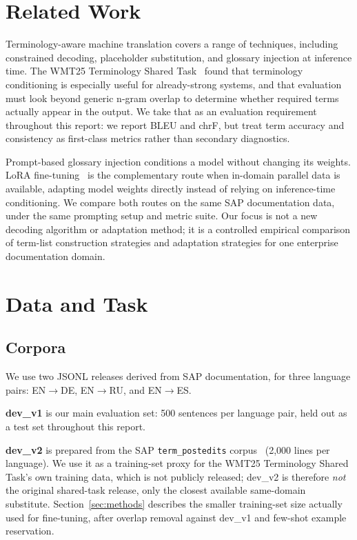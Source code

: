 \documentclass[11pt]{article}
\begin{document}
\section{Related Work}
\label{sec:related-work}

Terminology-aware machine translation covers a range of techniques, including constrained decoding, placeholder substitution, and glossary injection at inference time. The WMT25 Terminology Shared Task~\citep{semenov-etal-2025-wmt25} found that terminology conditioning is especially useful for already-strong systems, and that evaluation must look beyond generic n-gram overlap to determine whether required terms actually appear in the output. We take that as an evaluation requirement throughout this report: we report BLEU and chrF, but treat term accuracy and consistency as first-class metrics rather than secondary diagnostics.

Prompt-based glossary injection conditions a model without changing its weights. LoRA fine-tuning~\citep{hu2022lora} is the complementary route when in-domain parallel data is available, adapting model weights directly instead of relying on inference-time conditioning. We compare both routes on the same SAP documentation data, under the same prompting setup and metric suite. Our focus is not a new decoding algorithm or adaptation method; it is a controlled empirical comparison of term-list construction strategies and adaptation strategies for one enterprise documentation domain.

\section{Data and Task}
\label{sec:data-and-task}

\subsection{Corpora}
\label{sec:corpora}

We use two JSONL releases derived from SAP documentation, for three language pairs: EN$\rightarrow$DE, EN$\rightarrow$RU, and EN$\rightarrow$ES.

\textbf{dev\_v1} is our main evaluation set: 500 sentences per language pair, held out as a test set throughout this report.

\textbf{dev\_v2} is prepared from the SAP \texttt{term\_postedits} corpus~\citep{sap2024termpostedits} (2{,}000 lines per language). We use it as a training-set proxy for the WMT25 Terminology Shared Task's own training data, which is not publicly released; dev\_v2 is therefore \emph{not} the original shared-task release, only the closest available same-domain substitute. Section~\ref{sec:methods} describes the smaller training-set size actually used for fine-tuning, after overlap removal against dev\_v1 and few-shot example reservation.
\end{document}
